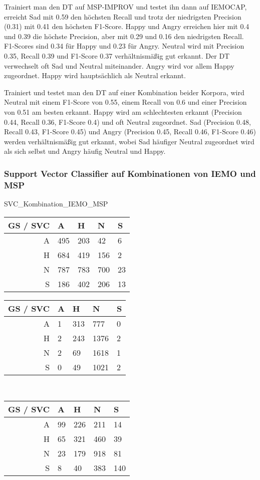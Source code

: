 \documentclass{article} %
\begin{document}
Trainiert man den DT auf MSP-IMPROV und testet ihn dann auf IEMOCAP, erreicht Sad mit 0.59 den höchsten Recall und trotz der niedrigsten Precision (0.31) mit 0.41 den höchsten F1-Score. 
Happy und Angry erreichen hier mit 0.4 und 0.39 die höchste Precision, aber mit 0.29 und 0.16 den niedrigsten Recall. F1-Scores sind 0.34 für Happy und 0.23 für Angry. Neutral wird mit Precision 0.35, Recall 0.39 und F1-Score 0.37 verhältnismäßig gut erkannt. 
Der DT verwechselt oft Sad und Neutral miteinander. Angry wird vor allem Happy zugeordnet. Happy wird hauptsächlich als Neutral erkannt. 

Trainiert und testet man den DT auf einer Kombination beider Korpora, wird Neutral mit einem F1-Score von 0.55, einem Recall von 0.6 und einer Precision von 0.51 am besten erkannt. Happy wird am schlechtesten erkannt (Precision 0.44, Recall 0.36, F1-Score 0.4) und oft Neutral zugeordnet. Sad (Precision 0.48, Recall 0.43, F1-Score 0.45) und Angry (Precision 0.45, Recall 0.46, F1-Score 0.46) werden verhältnismäßig gut erkannt, wobei Sad häufiger Neutral zugeordnet wird als sich selbst und Angry häufig Neutral und Happy. 

\subsubsection{Support Vector Classifier auf Kombinationen von IEMO und MSP}

SVC_Kombination_IEMO_MSP \\
\begin{tabular}{|r|llll|}
\hline
GS / SVC & A & H & N & S \\
\hline
A & 495 & 203 & 42 & 6 \\
H & 684 & 419 & 156 & 2 \\
N & 787 & 783 & 700 & 23 \\
S & 186 & 402 & 206 & 13 \\
\hline
\end{tabular}
\begin{tabular}{|r|llll|}
\hline
GS / SVC & A & H & N & S \\
\hline
A & 1 & 313 & 777 & 0 \\
H & 2 & 243 & 1376 & 2 \\
N & 2 & 69 & 1618 & 1 \\
S & 0 & 49 & 1021 & 2 \\
\hline
\end{tabular} \\
\begin{tabular}{|r|llll|}
\hline
GS / SVC & A & H & N & S \\
\hline
A & 99 & 226 & 211 & 14 \\
H & 65 & 321 & 460 & 39 \\
N & 23 & 179 & 918 & 81 \\
S & 8 & 40 & 383 & 140 \\
\hline
\end{tabular} \\
\end{document}
